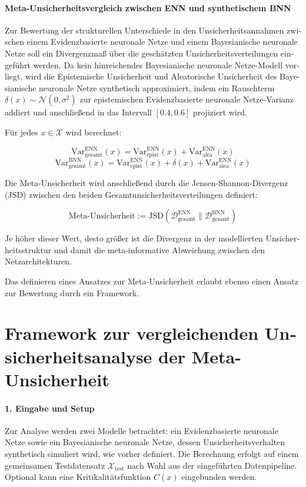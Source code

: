 \begin{otherlanguage}{ngerman}
{\paragraph{Meta-Unsicherheitsvergleich zwischen ENN und synthetischem BNN} Zur Bewertung der strukturellen Unterschiede in den Unsicherheitsannahmen zwischen einem \gls{Evidenzbasierte neuronale Netze} und einem \gls{Bayesianische neuronale Netze} soll ein Divergenzmaß über die geschätzten Unsicherheitsverteilungen eingeführt werden. Da kein hinreichendes \gls{Bayesianische neuronale Netze}-Modell vorliegt, wird die \gls{Epistemische Unsicherheit} und \gls{Aleatorische Unsicherheit} des \gls{Bayesianische neuronale Netze} synthetisch approximiert, indem ein Rauschterm \( \delta(x) \sim \mathcal{N}(0, \sigma^2) \) zur epistemischen \gls{Evidenzbasierte neuronale Netze}-Varianz addiert und anschließend in das Intervall \([0.4, 0.6]\) projiziert wird.

Für jedes \( x \in \mathcal{X} \) wird berechnet:

\[
\text{Var}_{\text{gesamt}}^{\text{ENN}}(x) = \text{Var}_{\text{epist}}^{\text{ENN}}(x) + \text{Var}_{\text{alea}}^{\text{ENN}}(x)
\]
\[
\text{Var}_{\text{gesamt}}^{\text{BNN}}(x) = \text{Var}_{\text{epist}}^{\text{ENN}}(x) + \delta(x) + \text{Var}_{\text{alea}}^{\text{ENN}}(x)
\]

Die Meta-Unsicherheit wird anschließend durch die Jensen-Shannon-Divergenz (JSD) zwischen den beiden Gesamtunsicherheitsverteilungen definiert:

\[
\text{Meta-Unsicherheit} := \text{JSD}\left( \mathcal{D}_{\text{gesamt}}^{\text{ENN}} \parallel \mathcal{D}_{\text{gesamt}}^{\text{BNN}} \right)
\]

Je höher dieser Wert, desto größer ist die Divergenz in der modellierten Unsicherheitsstruktur und damit die meta-informative Abweichung zwischen den Netzarchitekturen. 

Das definieren eines Ansatzes zur Meta-Unsicherheit erlaubt ebenso einen Ansatz zur Bewertung durch ein Framework. 

\section*{Framework zur vergleichenden Unsicherheitsanalyse der Meta-Unsicherheit}

\paragraph{1. Eingabe und Setup} Zur Analyse werden zwei Modelle betrachtet: ein \gls{Evidenzbasierte neuronale Netze} sowie ein \gls{Bayesianische neuronale Netze}, dessen Unsicherheitsverhalten synthetisch simuliert wird, wie vorher definiert. Die Berechnung erfolgt auf einem gemeinsamen Testdatensatz \( \mathcal{X}_{\text{test}} \) nach Wahl aus der eingeführten Datenpipeline. Optional kann eine Kritikalitätsfunktion \( C(x) \) eingebunden werden.

}
\end{otherlanguage}
